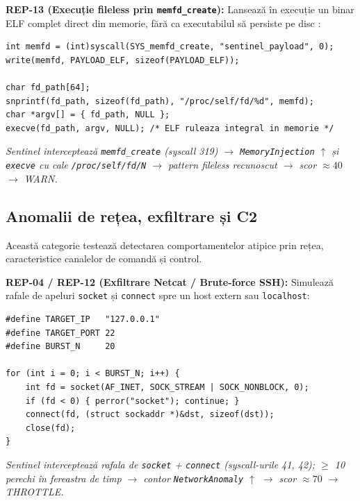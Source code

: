\par \textbf{REP-13 (Execuție fileless prin \texttt{memfd\_create}):} Lansează în execuție un binar ELF complet direct din memorie, fără ca executabilul să persiste pe disc \cite{Elastic2022}:

\begin{lstlisting}[style=cstyle,caption={REP-13: Lanțul de execuție fileless via memfd\_create}]
int memfd = (int)syscall(SYS_memfd_create, "sentinel_payload", 0);
write(memfd, PAYLOAD_ELF, sizeof(PAYLOAD_ELF));

char fd_path[64];
snprintf(fd_path, sizeof(fd_path), "/proc/self/fd/%d", memfd);
char *argv[] = { fd_path, NULL };
execve(fd_path, argv, NULL); /* ELF ruleaza integral in memorie */
\end{lstlisting}
\par\textit{Sentinel interceptează \texttt{memfd\_create} (syscall 319) $\rightarrow$ \texttt{MemoryInjection} $\uparrow$ și \texttt{execve} cu cale \texttt{/proc/self/fd/N} $\rightarrow$ pattern \textit{fileless} recunoscut $\rightarrow$ scor $\approx 40$ $\rightarrow$ WARN.}

\subsection{Anomalii de rețea, exfiltrare și C2}
\label{subsec:attack_network}

\par Această categorie testează detectarea comportamentelor atipice prin rețea, caracteristice canalelor de comandă și control.

\par \textbf{REP-04 / REP-12 (Exfiltrare Netcat / Brute-force SSH):} Simulează rafale de apeluri \texttt{socket} și \texttt{connect} spre un host extern sau \texttt{localhost}:

\begin{lstlisting}[style=cstyle,caption={REP-04 / REP-12: Rafală de conexiuni TCP anormale}]
#define TARGET_IP   "127.0.0.1"
#define TARGET_PORT 22
#define BURST_N     20

for (int i = 0; i < BURST_N; i++) {
    int fd = socket(AF_INET, SOCK_STREAM | SOCK_NONBLOCK, 0);
    if (fd < 0) { perror("socket"); continue; }
    connect(fd, (struct sockaddr *)&dst, sizeof(dst));
    close(fd);
}
\end{lstlisting}
\par\textit{Sentinel interceptează rafala de \texttt{socket} + \texttt{connect} (syscall-urile 41, 42); $\geq$ 10 perechi în fereastra de timp $\rightarrow$ contor \texttt{NetworkAnomaly} $\uparrow$ $\rightarrow$ scor $\approx 70$ $\rightarrow$ THROTTLE.}

